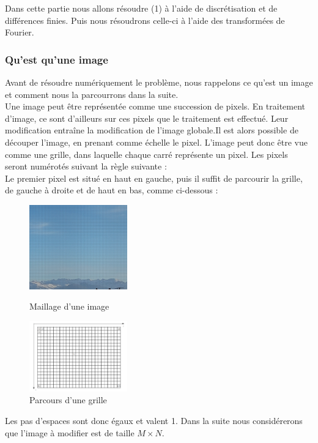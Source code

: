 Dans cette partie nous allons résoudre (1) à l'aide de discrétisation et de différences finies. Puis nous résoudrons celle-ci à l'aide des transformées de Fourier. \\
\subsubsection{Qu'est qu'une image}
Avant de résoudre numériquement le problème, nous rappelons ce qu'est un image et comment nous la  parcourrons dans la suite.\\
Une image peut être représentée comme une succession de pixels. En traitement d'image, ce sont d'ailleurs sur ces pixels que le traitement est effectué. Leur modification entraîne la modification de l'image globale.Il est alors possible de découper l'image, en prenant comme échelle le pixel. L'image peut donc être vue comme une grille, dans laquelle chaque carré représente un pixel. Les pixels seront numérotés suivant la règle suivante : \\

Le premier pixel est situé en haut en gauche, puis il suffit de parcourir la grille, de gauche à droite et de haut en bas, comme ci-dessous :  
\begin{figure}[!htb]
   \begin{minipage}{0.5\textwidth}
     \centering
     \includegraphics[width = 120pt]{Images/Montagne_grille.jpg}
        \caption{Maillage d'une image}
      \end{minipage}\hfill
   \begin{minipage}{0.5\textwidth}
     \centering
     \includegraphics[width = 120pt]{Images/grille.png}
	\caption{Parcours d'une grille}
      \end{minipage}\hfill
\end{figure}

Les pas d'espaces sont donc égaux et valent 1. Dans la suite nous considérerons que l'image à modifier est de taille $M \times N$.

